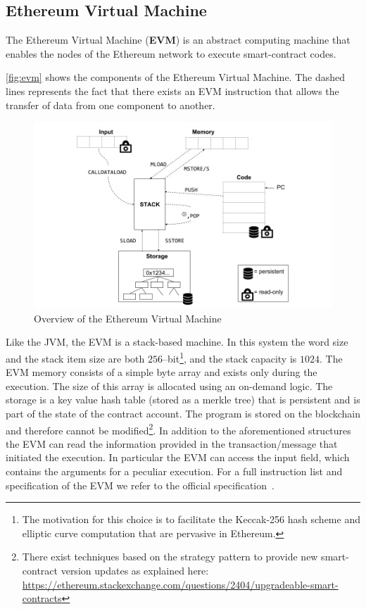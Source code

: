 \subsection{Ethereum Virtual Machine}
\label{sec:evm}
The Ethereum Virtual Machine (\textbf{EVM}) is an abstract computing machine
that enables the nodes of the Ethereum network to execute smart-contract
codes.


\autoref{fig:evm} shows the components of the Ethereum Virtual Machine.
The dashed lines represents the fact that there exists an EVM instruction
that allows the transfer of data from one component to another.
\begin{figure}
	\begin{center}
		\includegraphics[width=\textwidth]
        {./res/img/architecture/evm/EVM.png}
	\end{center}
	\caption{Overview of the Ethereum Virtual Machine}
	\label{fig:evm}
\end{figure}
Like the JVM, the EVM is a stack-based machine. In this system the word size
and the stack item size are both $256$--bit\footnote{The motivation
for this choice is to facilitate the Keccak-256 hash scheme and elliptic
curve computation that are pervasive in Ethereum.},
and the stack capacity is $1024$.
The EVM memory consists of a simple byte array and exists only during the
execution. The size of this array is allocated using an on-demand logic.
The storage is a key value hash table (stored as a merkle tree) that is
persistent and is part of the state of the contract account.
The program is stored on the blockchain and therefore cannot
be modified\footnote{There exist
techniques based on the strategy pattern to provide new smart-contract version
updates as explained here:
\url{https://ethereum.stackexchange.com/questions/2404/upgradeable-smart-contracts}}.
In addition to the aforementioned structures the EVM can read the information
provided in the transaction/message that initiated the execution. In particular
the EVM can access the input field, which contains the arguments for a peculiar
execution.
For a full instruction list and specification of the EVM
we refer to the official specification~\cite[Appendix H]{wood2018ethereum}.


